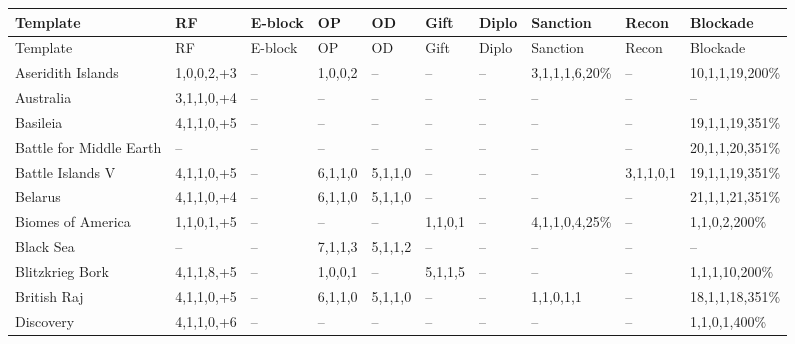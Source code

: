 \tiny
\begin{longtable}{|p{1.8cm}|p{1cm}|p{0.8cm}|p{1cm}|p{1cm}|p{1cm}|p{1cm}|p{1.3cm}|p{1cm}|p{1.4cm}|}
\hline
\rowcolor{Baby_Blue}
Template & RF & E-block & OP & OD & Gift & Diplo & Sanction & Recon & Blockade \\ \hline\hline
\endfirsthead
\hline
\rowcolor{Baby_Blue}
Template & RF & E-block & OP & OD & Gift & Diplo & Sanction & Recon & Blockade \\ \hline\hline
\endhead
Aseridith Islands         & 1,0,0,2,+3  & –                    & 1,0,0,2   & –         & –   & –   & 3,1,1,1,6,20\%  & –   & 10,1,1,19,200\% \\ \hline
Australia                 & 3,1,1,0,+4  & –                    & –         & –         & –   & –   & –               & –   & – \\ \hline
Basileia                  & 4,1,1,0,+5  & –                    & –         & –         & –   & –   & –               & –   & 19,1,1,19,351\% \\ \hline
Battle for Middle Earth   & –           & –                    & –         & –         & –   & –   & –               & –   & 20,1,1,20,351\% \\ \hline
Battle Islands V          & 4,1,1,0,+5  & –                    & 6,1,1,0   & 5,1,1,0   & –   & –   & –               & 3,1,1,0,1 & 19,1,1,19,351\% \\ \hline
Belarus                   & 4,1,1,0,+4  & –                    & 6,1,1,0   & 5,1,1,0   & –   & –   & –               & –   & 21,1,1,21,351\% \\ \hline
Biomes of America         & 1,1,0,1,+5  & –                    & –         & –         & 1,1,0,1 & – & 4,1,1,0,4,25\%  & –   & 1,1,0,2,200\% \\ \hline
Black Sea                 & –           & –                    & 7,1,1,3   & 5,1,1,2   & –   & –   & –               & –   & – \\ \hline
Blitzkrieg Bork           & 4,1,1,8,+5  & –                    & 1,0,0,1   & –         & 5,1,1,5 & – & –               & –   & 1,1,1,10,200\% \\ \hline
British Raj               & 4,1,1,0,+5  & –                    & 6,1,1,0   & 5,1,1,0   & –   & –   & 1,1,0,1,1       & –   & 18,1,1,18,351\% \\ \hline
Discovery                 & 4,1,1,0,+6  & –                    & –         & –         & –   & –   & –               & –   & 1,1,0,1,400\% \\ \hline

\end{longtable}
